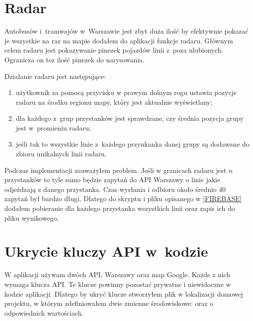 \documentclass{SGGW-thesis}
\begin{document}
\label{RADAR}
\section{Radar}
Autobusów i~tramwajów w~Warszawie jest zbyt duża ilość by efektywnie pokazać je wszystkie na raz na mapie dodałem do aplikacji funkcje radaru.
Głównym celem radaru jest pokazywanie pinezek pojazdów linii z~poza ulubionych.
Ogranicza on tez ilość pinezek do narysowania.

Działanie radaru jest następujące:
\begin{enumerate}
  \item{użytkownik za pomocą przycisku w prawym dolnym rogu ustawia pozycje radaru na środku regionu mapy, który jest aktualnie wyświetlany;}
  \item{dla każdego z~grup przystanków jest sprawdzane, czy średnia pozycja grupy jest w~promieniu radaru;}
  \item{jeśli tak to wszystkie linie z~każdego przynkanka danej grupy są dodawane do zbioru unikalnych linii radaru.}
\end{enumerate}
Podczas implementacji zauważyłem problem.
Jeśli w granicach radaru jest $n$ przystanków to tyle samo będzie zapytań do API Warszawy o linie jakie odjeżdzają z danego przystanka.
Czas wysłania i odbioru około średnio 40 zapytań był bardzo długi.
Dlatego do skryptu i pliku opisanego w \ref{FIREBASE} dodałem pobieranie dla każdego przystanka wszystkich linii oraz zapis ich do pliku wynikowego.



\section{Ukrycie kluczy API w~kodzie}
W aplikacji używam dwóch API, Warszawy oraz map Google.
Każde z nich wymaga klucza API.
Te klucze powinny pozostać prywatne i niewidoczne w kodzie aplikacji.
Dlatego by ukryć klucze stworzyłem plik  w lokalizacji domowej projektu, w którym zdefiniowałem dwie zmienne środowiskowe:
 oraz  o odpowiednich wartościach. 
\end{document}
